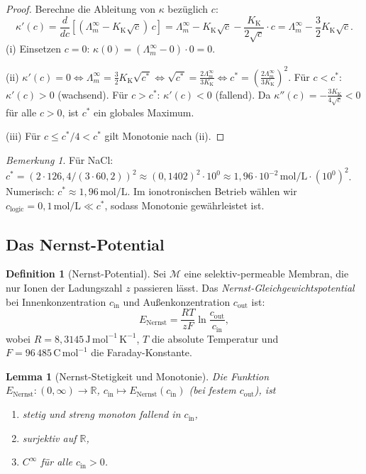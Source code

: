 ﻿\documentclass[a4paper,12pt]{article}
\theoremstyle{plain}
\newtheorem{lemma}{Lemma}
\theoremstyle{definition}
\newtheorem{definition}{Definition}
\theoremstyle{remark}
\newtheorem{bemerkung}{Bemerkung}
\begin{document}
\begin{proof}
Berechne die Ableitung von $\kappa$ bez\"uglich $c$:
\[
\kappa'(c) = \frac{d}{dc}\!\left[(\Lambda_m^\infty - K_{\mathrm{K}}\sqrt{c})\,c\right]
= \Lambda_m^\infty - K_{\mathrm{K}}\sqrt{c} - \frac{K_{\mathrm{K}}}{2\sqrt{c}}\cdot c
= \Lambda_m^\infty - \frac{3}{2}K_{\mathrm{K}}\sqrt{c}.
\]
(i) Einsetzen $c=0$: $\kappa(0) = (\Lambda_m^\infty - 0)\cdot 0 = 0$. \checkmark

(ii) $\kappa'(c) = 0 \Leftrightarrow \Lambda_m^\infty = \frac{3}{2}K_{\mathrm{K}}\sqrt{c^*}
\Leftrightarrow \sqrt{c^*} = \frac{2\Lambda_m^\infty}{3K_{\mathrm{K}}}
\Leftrightarrow c^* = \left(\frac{2\Lambda_m^\infty}{3K_{\mathrm{K}}}\right)^2$.
F\"ur $c < c^*$: $\kappa'(c) > 0$ (wachsend).
F\"ur $c > c^*$: $\kappa'(c) < 0$ (fallend).
Da $\kappa''(c) = -\frac{3K_{\mathrm{K}}}{4\sqrt{c}} < 0$ f\"ur alle $c > 0$,
ist $c^*$ ein globales Maximum.

(iii) F\"ur $c \leq c^*/4 < c^*$ gilt Monotonie nach (ii). \checkmark
\end{proof}

\begin{bemerkung}
F\"ur NaCl: $c^* = (2\cdot 126{,}4/(3\cdot 60{,}2))^2 \approx (0{,}1402)^2 \cdot 10^0
\approx 1{,}96 \cdot 10^{-2}\,\mathrm{mol/L}\cdot (10^0)^2$.
Numerisch: $c^* \approx 1{,}96\,\mathrm{mol/L}$.
Im ionotronischen Betrieb wählen wir $c_{\mathrm{logic}} = 0{,}1\,\mathrm{mol/L}
\ll c^*$, sodass Monotonie gew\"ahrleistet ist.
\end{bemerkung}

\subsection{Das Nernst-Potential}

\begin{definition}[Nernst-Potential]
\label{def:nernst}
Sei $\mathcal{M}$ eine selektiv-permeable Membran, die nur Ionen der
Ladungszahl $z$ passieren l\"asst.
Das \emph{Nernst-Gleichgewichtspotential} bei Innenkonzentration
$c_{\mathrm{in}}$ und Au{\ss}enkonzentration $c_{\mathrm{out}}$ ist:
\[
E_{\mathrm{Nernst}} = \frac{RT}{zF}\ln\frac{c_{\mathrm{out}}}{c_{\mathrm{in}}},
\]
wobei $R = 8{,}3145\,\mathrm{J\,mol^{-1}\,K^{-1}}$, $T$ die absolute Temperatur
und $F = 96\,485\,\mathrm{C\,mol^{-1}}$ die Faraday-Konstante.
\end{definition}

\begin{lemma}[Nernst-Stetigkeit und Monotonie]
\label{lem:nernst_prop}
Die Funktion $E_{\mathrm{Nernst}}: (0,\infty) \to \mathbb{R}$,
$c_{\mathrm{in}} \mapsto E_{\mathrm{Nernst}}(c_{\mathrm{in}})$
(bei festem $c_{\mathrm{out}}$), ist
\begin{enumerate}[label=(\roman*)]
    \item stetig und streng monoton fallend in $c_{\mathrm{in}}$,
    \item surjektiv auf $\mathbb{R}$,
    \item $C^\infty$ f\"ur alle $c_{\mathrm{in}} > 0$.
\end{enumerate}
\end{lemma}
\end{document}
